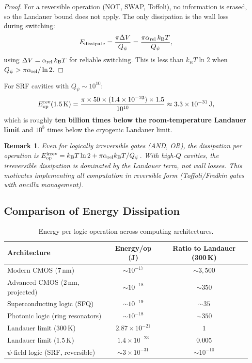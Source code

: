\documentclass[12pt,a4paper,twoside]{article}
\newtheorem{remark}[theorem]{Remark}
\newcommand{\kB}{k_{\mathrm{B}}}
\begin{document}
\begin{proof}
For a reversible operation (NOT, SWAP, Toffoli), no information is erased, so the Landauer bound does not apply. The only dissipation is the wall loss during switching:
\begin{equation}
E_{\rm dissipate} = \frac{\pi\Delta V}{Q_\psi} = \frac{\pi\alpha_{\rm rel}\,\kB T}{Q_\psi},
\end{equation}
using $\Delta V = \alpha_{\rm rel}\,\kB T$ for reliable switching. This is less than $\kB T \ln 2$ when $Q_\psi > \pi\alpha_{\rm rel}/\ln 2$.
\end{proof}

For SRF cavities with $Q_\psi \sim 10^{10}$:
\begin{equation}
E_{\rm op}^{\rm rev}(1.5\,\si{K}) = \frac{\pi \times 50 \times (1.4 \times 10^{-23}) \times 1.5}{10^{10}} \approx 3.3 \times 10^{-31}\,\si{J},
\label{eq:srf_dissipation}
\end{equation}
which is roughly \textbf{ten billion times below the room-temperature Landauer limit} and $10^{8}$ times below the cryogenic Landauer limit.

\begin{remark}
Even for logically irreversible gates (AND, OR), the dissipation per operation is $E_{\rm op}^{\rm irrev} = \kB T \ln 2 + \pi\alpha_{\rm rel}\kB T/Q_\psi$. With high-$Q$ cavities, the irreversible dissipation is dominated by the Landauer term, not wall losses. This motivates implementing all computation in reversible form (Toffoli/Fredkin gates with ancilla management).
\end{remark}

\subsection{Comparison of Energy Dissipation}\label{sec:energy_comparison}

\begin{table}[H]
\centering
\caption{Energy per logic operation across computing architectures.}
\label{tab:energy}
\begin{tabular}{lcc}
\toprule
\textbf{Architecture} & \textbf{Energy/op (J)} & \textbf{Ratio to Landauer (300\,K)} \\
\midrule
Modern CMOS (7\,nm) & $\sim 10^{-17}$ & $\sim 3{,}500$ \\
Advanced CMOS (2\,nm, projected) & $\sim 10^{-18}$ & $\sim 350$ \\
Superconducting logic (SFQ) & $\sim 10^{-19}$ & $\sim 35$ \\
Photonic logic (ring resonators) & $\sim 10^{-18}$ & $\sim 350$ \\
Landauer limit (300\,K) & $2.87\times 10^{-21}$ & $1$ \\
Landauer limit (1.5\,K) & $1.4\times 10^{-23}$ & $0.005$ \\
$\psi$-field logic (SRF, reversible) & $\sim 3\times 10^{-31}$ & $\sim 10^{-10}$ \\
\bottomrule
\end{tabular}
\end{table}
\end{document}
